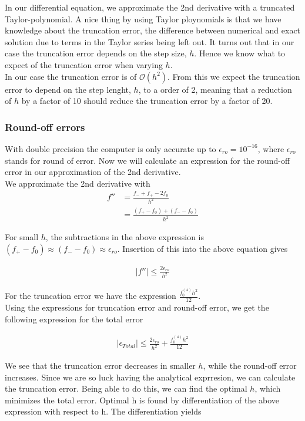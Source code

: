 \documentclass{article}
\begin{document}
In our differential equation, we approximate the 2nd derivative with a truncated Taylor-polynomial. A nice thing by using Taylor ploynomials is that we have knowledge about the truncation error, the difference between numerical and exact solution due to terms in the Taylor series being left out. It turns out that in our case the truncation error depends on the step size, $h$. Hence we know what to expect of the truncation error when varying $h$. \\

In our case the truncation error is of $\mathcal{O}(h^2)$. From this we expect the truncation error to depend on the step lenght, $h$, to a order of 2, meaning that a reduction of $h$ by a factor of 10 should reduce the truncation error by a factor of 20.

\subsubsection{Round-off errors}
With double precision the computer is only accurate up to $\epsilon_{ro} = 10^{-16}$, where $\epsilon_{ro}$ stands for round of error. Now we will calculate an expression for the round-off error in our approximation of the 2nd derivative.\\

We approximate the 2nd derivative with
\begin{align}
f'' &= \frac{f_{-} + f_{+} - 2f_0}{h^2}  \\
&= \frac{(f_{+} - f_0) + (f_{-} - f_0)}{h^2}
\end{align}

For small $h$, the subtractions in the above expression is $ (f_+ - f_0) \approx (f_- - f_0) \approx \epsilon_{ro}$. Insertion of this into the above equation gives

\begin{align}
|f''| \leq \frac{2 \epsilon_{ro}}{h^2}
\end{align}

For the truncation error we have the expression $ \frac{f_0^{(4)}h^2}{12}$.  \\

Using the expressions for truncation error and round-off error, we get the following expression for the total error

\begin{align}
|\epsilon_{Total}| \leq \frac{2 \epsilon_{ro}}{h^2} + \frac{f_0^{(4)}h^2}{12}
\end{align}

We see that the truncation error decreases in smaller $h$, while the round-off error increases. Since we are so luck having the analytical exprresion, we can calculate the truncation error. Being able to do this, we can find the optimal $h$, which minimizes the total error. Optimal h is found by differentiation of the above expression with respect to h. The differentiation yields
\end{document}
